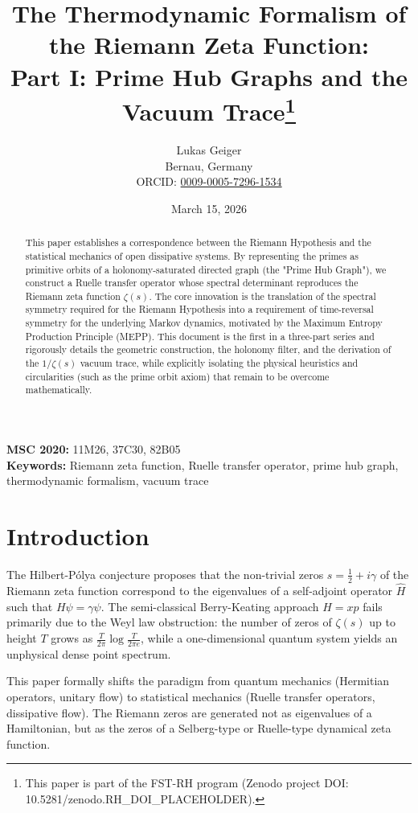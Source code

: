 \documentclass[12pt,a4paper]{article}
\title{The Thermodynamic Formalism of the Riemann Zeta Function:\\ Part I: Prime Hub Graphs and the Vacuum Trace\thanks{This paper is part of the FST-RH program (Zenodo project DOI: 10.5281/zenodo.RH\_DOI\_PLACEHOLDER).}}
\author{Lukas Geiger\\
\small Bernau, Germany\\
\small ORCID: \href{https://orcid.org/0009-0005-7296-1534}{0009-0005-7296-1534}}
\date{March 15, 2026}
\theoremstyle{definition}
\theoremstyle{remark}
\begin{document}
\maketitle

\begin{abstract}
This paper establishes a correspondence between the Riemann Hypothesis and the statistical mechanics of open dissipative systems. By representing the primes as primitive orbits of a holonomy-saturated directed graph (the "Prime Hub Graph"), we construct a Ruelle transfer operator whose spectral determinant reproduces the Riemann zeta function $\zeta(s)$. The core innovation is the translation of the spectral symmetry required for the Riemann Hypothesis into a requirement of time-reversal symmetry for the underlying Markov dynamics, motivated by the Maximum Entropy Production Principle (MEPP). This document is the first in a three-part series and rigorously details the geometric construction, the holonomy filter, and the derivation of the $1/\zeta(s)$ vacuum trace, while explicitly isolating the physical heuristics and circularities (such as the prime orbit axiom) that remain to be overcome mathematically.
\end{abstract}

\noindent\textbf{MSC 2020:} 11M26, 37C30, 82B05\\
\textbf{Keywords:} Riemann zeta function, Ruelle transfer operator, prime hub graph, thermodynamic formalism, vacuum trace

\tableofcontents

\section{Introduction}

The Hilbert-P\'olya conjecture proposes that the non-trivial zeros $s = \frac{1}{2} + i\gamma$ of the Riemann zeta function correspond to the eigenvalues of a self-adjoint operator $\hat{H}$ such that $H\psi = \gamma\psi$. The semi-classical Berry-Keating approach $\hat{H} = xp$ fails primarily due to the Weyl law obstruction: the number of zeros of $\zeta(s)$ up to height $T$ grows as $\frac{T}{2\pi}\log \frac{T}{2\pi e}$, while a one-dimensional quantum system yields an unphysical dense point spectrum.

This paper formally shifts the paradigm from quantum mechanics (Hermitian operators, unitary flow) to statistical mechanics (Ruelle transfer operators, dissipative flow). The Riemann zeros are generated not as eigenvalues of a Hamiltonian, but as the zeros of a Selberg-type or Ruelle-type dynamical zeta function.
\end{document}
